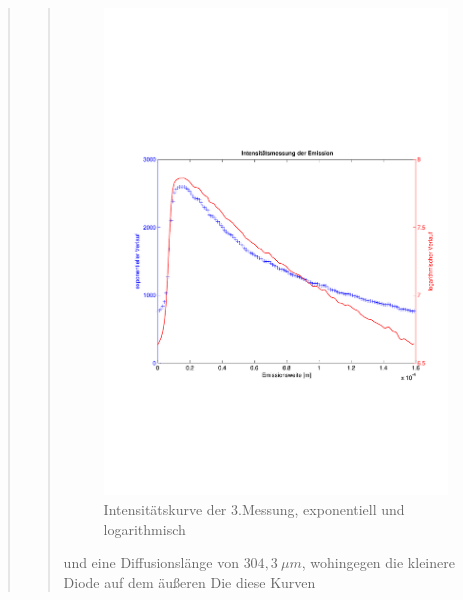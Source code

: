 \begin{quote}
\begin{quote}
        \begin{figure}[H]
                    \centering
                        \includegraphics[scale=0.53, trim = 1cm 6cm 1.5cm 8cm,
                        clip]{./Emissionsbilder/drei/Intensitat_3.pdf}
                        \caption{Intensitätskurve der 3.Messung, exponentiell
                        und logarithmisch}
                            \label{fig:./Emissionsbilder/drei/Intensitat_3.pdf}
        \end{figure}

        und eine Diffusionslänge von $304,3\ \mu m$, wohingegen die kleinere
        Diode auf dem äußeren Die diese Kurven


\end{quote}
\end{quote}
